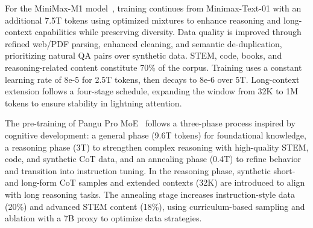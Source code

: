 For the MiniMax-M1 model~\cite{chen2025minimax}, training continues from Minimax-Text-01 with an additional 7.5T tokens using optimized mixtures to enhance reasoning and long-context capabilities while preserving diversity. Data quality is improved through refined web/PDF parsing, enhanced cleaning, and semantic de-duplication, prioritizing natural QA pairs over synthetic data. STEM, code, books, and reasoning-related content constitute 70\% of the corpus. Training uses a constant learning rate of 8e-5 for 2.5T tokens, then decays to 8e-6 over 5T. Long-context extension follows a four-stage schedule, expanding the window from 32K to 1M tokens to ensure stability in lightning attention.

The pre-training of Pangu Pro MoE~\cite{tang2025pangu} follows a three-phase process inspired by cognitive development: a general phase (9.6T tokens) for foundational knowledge, a reasoning phase (3T) to strengthen complex reasoning with high-quality STEM, code, and synthetic CoT data, and an annealing phase (0.4T) to refine behavior and transition into instruction tuning. In the reasoning phase, synthetic short- and long-form CoT samples and extended contexts (32K) are introduced to align with long reasoning tasks. The annealing stage increases instruction-style data (20\%) and advanced STEM content (18\%), using curriculum-based sampling and ablation with a 7B proxy to optimize data strategies.

